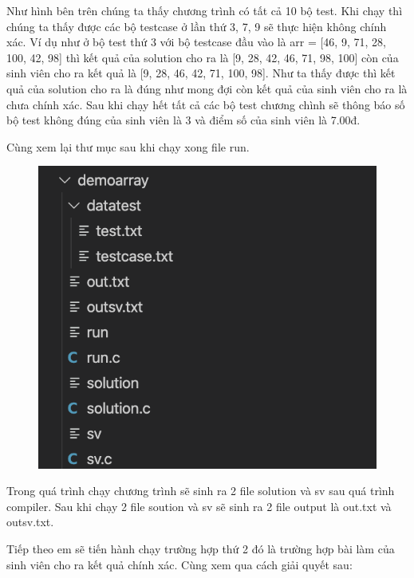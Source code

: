 \documentclass[12pt,a4paper]{report}
\begin{document}
Như hình bên trên chúng ta thấy chương trình có tất cả 10 bộ test. Khi chạy thì chúng ta thấy được các bộ testcase ở lần thứ 3, 7, 9 sẽ thực hiện không chính xác. Ví dụ như ở bộ test thứ 3 với bộ testcase đầu vào là arr = [46, 9, 71, 28, 100, 42, 98] thì kết quả của solution cho ra là [9, 28, 42, 46, 71, 98, 100] còn của sinh viên cho ra kết quả là [9, 28, 46, 42, 71, 100, 98]. Như ta thấy được thì kết quả của solution cho ra là đúng như mong đợi còn kết quả của sinh viên cho ra là chưa chính xác. Sau khi chạy hết tất cả các bộ test chương chình sẽ thông báo số bộ test không đúng của sinh viên là 3 và điểm số của sinh viên là 7.00đ. \newpage

Cùng xem lại thư mục sau khi chạy xong file run.

\begin{figure}[ht]
\begin{center}
\includegraphics[scale=.3]{hinhanh/cautrucsauchayrunarray.png}
\end{center}
\end{figure}

Trong quá trình chạy chương trình sẽ sinh ra 2 file solution và sv sau quá trình compiler. Sau khi chạy 2 file soution và sv sẽ sinh ra 2 file output là out.txt và outsv.txt.

Tiếp theo em sẽ tiến hành chạy trường hợp thứ 2 đó là trường hợp bài làm của sinh viên cho ra kết quả chính xác. Cùng xem qua cách giải quyết sau:
\end{document}
